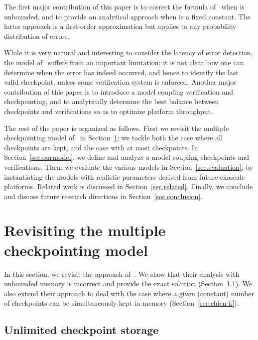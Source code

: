 \documentclass[10pt,table]{article}
\begin{document}
The first major contribution of this paper is to correct the formula of~\cite{LuZhengChien2013}
when  is unbounded, and to provide an analytical approach when  is a fixed constant. 
The latter approach is a first-order approximation but applies to any probability distribution of errors.

While it is very natural and interesting to consider the latency of error detection, the model 
of~\cite{LuZhengChien2013} suffers from an important limitation: it is not clear how one can 
determine when the error has indeed occurred, and hence to identify the last valid checkpoint, 
unless some verification system is enforced. Another major contribution of this paper is to introduce 
a model coupling verification and checkpointing, and to analytically determine the best balance 
between checkpoints and verifications so as to optimize platform throughput.

The rest of the paper is organized as follows. First we revisit the multiple checkpointing model
of~\cite{LuZhengChien2013} in Section~\ref{sec.chien}; we tackle both the case where all 
checkpoints are kept, and the case with at most  checkpoints. In Section~\ref{sec.ourmodel},
we define and analyze a model coupling checkpoints and verifications. 
Then, we evaluate the various models in Section~\ref{sec.evaluation}, by 
instantiating the models with realistic parameters derived from future exascale platforms. 
Related work is discussed in Section~\ref{sec.related}. 
Finally, we conclude and discuss future research directions in Section~\ref{sec.conclusion}. 

\section{Revisiting the multiple checkpointing model}
\label{sec.chien}

In this section, we revisit the approach of~\cite{LuZhengChien2013}.
We show that their analysis with unbounded memory is incorrect and provide the exact solution 
(Section~\ref{sec.chien-infty}). We also
extend their approach to deal with the case where a given (constant) number of 
checkpoints can be simultaneously kept in memory (Section~\ref{sec.chien-k}).



\subsection{Unlimited checkpoint storage}
\label{sec.chien-infty}
\end{document}
